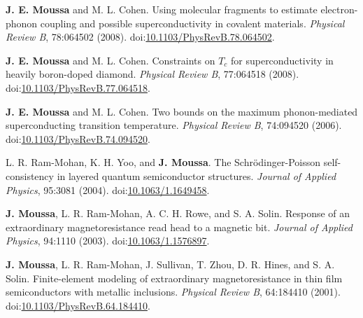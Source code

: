 \documentclass[10pt]{article}
\makeatletter
\newlength{\bibhang}
\newlength{\bibsep}
 {\@listi \global\bibsep\itemsep \global\advance\bibsep by\parsep}
\newenvironment{bibsection}%
        {\vspace{-1.6\baselineskip}\begin{etaremune}[leftmargin=1.6em]{%
       \setlength{\leftmargin}{\bibhang}%
       \setlength{\itemindent}{-\leftmargin}%
       \setlength{\itemsep}{\bibsep}%
       \setlength{\parsep}{\z@}%
        \setlength{\partopsep}{0pt}%
        \setlength{\topsep}{0pt}}}
        {\end{etaremune}\vspace{-.6\baselineskip}}
\newcommand\doilink[1]{\href{http://dx.doi.org/#1}{#1}}
\newcommand\doi[1]{doi:\doilink{#1}}
\makeatother
\begin{document}
\begin{bibsection}
    \item \textbf{J. E. Moussa} and M. L. Cohen.
         Using molecular fragments to estimate electron-phonon coupling and possible superconductivity in covalent materials.
         \emph{Physical Review B}, 78:064502 (2008). \doi{10.1103/PhysRevB.78.064502}.

    \item \textbf{J. E. Moussa} and M. L. Cohen.
         Constraints on $T_c$ for superconductivity in heavily boron-doped diamond.
         \emph{Physical Review B}, 77:064518 (2008). \\ \doi{10.1103/PhysRevB.77.064518}.

    \item \textbf{J. E. Moussa} and M. L. Cohen.
         Two bounds on the maximum phonon-mediated superconducting transition temperature.
         \emph{Physical Review B}, 74:094520 (2006). \\ \doi{10.1103/PhysRevB.74.094520}.

    \item L. R. Ram-Mohan, K. H. Yoo, and \textbf{J. Moussa}.
         The Schr\"odinger-Poisson self-consistency in layered quantum semiconductor structures.
         \emph{Journal of Applied Physics}, 95:3081 (2004). \doi{10.1063/1.1649458}.

    \item \textbf{J. Moussa}, L. R. Ram-Mohan, A. C. H. Rowe, and S. A. Solin.
        Response of an extraordinary magnetoresistance read head to a magnetic bit.
        \emph{Journal of Applied Physics}, 94:1110 (2003). \doi{10.1063/1.1576897}.

    \item \textbf{J. Moussa}, L. R. Ram-Mohan, J. Sullivan, T. Zhou, D. R. Hines, and S. A. Solin.
        Finite-element modeling of extraordinary magnetoresistance in thin film semiconductors with metallic inclusions.
        \emph{Physical Review B}, 64:184410 (2001). \doi{10.1103/PhysRevB.64.184410}.

\end{bibsection}
\end{document}
